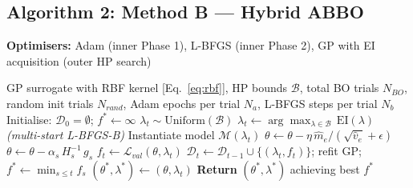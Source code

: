 \documentclass[11pt]{article}
\theoremstyle{definition}
\begin{document}
\begin{algorithm}[H]
\end{algorithm}

\subsection{Algorithm 2: Method B --- Hybrid ABBO}
\begin{algorithm}[H]
\caption{Method B --- Hybrid ABBO}
\label{alg:abbo}
\textbf{Optimisers:} Adam (inner Phase 1), L-BFGS (inner Phase 2),
GP with EI acquisition (outer HP search)
\begin{algorithmic}[1]
\Require GP surrogate with RBF kernel [Eq.~\eqref{eq:rbf}],
         HP bounds $$,
         total BO trials $N_{BO}$,
         random init trials $N_{rand}$,
         Adam epochs per trial $N_a$,
         L-BFGS steps per trial $N_b$
\State Initialise: $_0 = \emptyset$; $f^* \leftarrow \infty$
    \State $\lambda_t \sim {}()$
  \Else
    \State $\lambda_t \leftarrow \arg\max_{\lambda \in {}}\,(\lambda)$
           \hfill \textit{(multi-start L-BFGS-B)}
  \EndIf
  \State Instantiate model $(\lambda_t)$
    \State $\theta \leftarrow \theta - \eta\,_e / (+\epsilon)$
  \EndFor
    \State $\theta \leftarrow \theta - \alpha_s\,H_s^{-1}\,g_s$
  \EndFor
  \State $f_t \leftarrow {}_{val}(\theta, \lambda_t)$
  \State $_t \leftarrow {}_{t-1} \cup \{(\lambda_t, f_t)\}$;
         refit GP; $f^* \leftarrow \min_{s \le t} f_s$
    \State $(\theta^*, \lambda^*) \leftarrow (\theta, \lambda_t)$
  \EndIf
\EndFor
\State \textbf{Return} $(\theta^*, \lambda^*)$ achieving best $f^*$
\end{algorithmic}
\end{algorithm}
\end{document}
